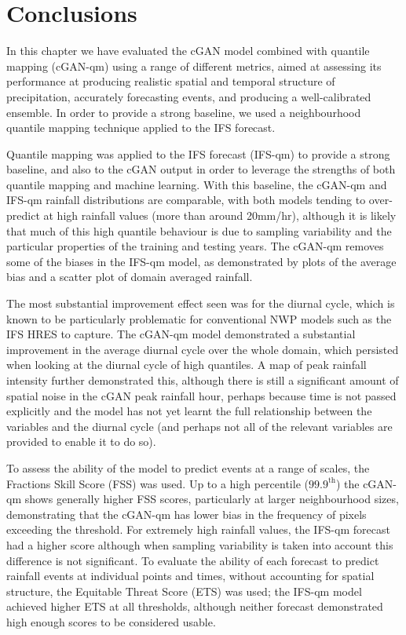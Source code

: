\documentclass[../main.tex]{subfiles}
\begin{document}

\section{Conclusions}

In this chapter we have evaluated the cGAN model combined with quantile mapping (cGAN-qm) using a range of different metrics, aimed at assessing its performance at producing realistic spatial and temporal structure of precipitation, accurately forecasting events, and producing a well-calibrated ensemble. In order to provide a strong baseline, we used a neighbourhood quantile mapping technique applied to the IFS forecast. 

Quantile mapping was applied to the IFS forecast (IFS-qm) to provide a strong baseline, and also to the cGAN output in order to leverage the strengths of both quantile mapping and machine learning. With this baseline, the cGAN-qm and IFS-qm rainfall distributions are comparable, with both models tending to over-predict at high rainfall values (more than around 20mm/hr), although it is likely that much of this high quantile behaviour is due to sampling variability and the particular properties of the training and testing years. The cGAN-qm removes some of the biases in the IFS-qm model, as demonstrated by plots of the average bias and a scatter plot of domain averaged rainfall.

The most substantial improvement effect seen was for the diurnal cycle, which is known to be particularly problematic for conventional NWP models such as the IFS HRES to capture. The cGAN-qm model demonstrated a substantial improvement in the average diurnal cycle over the whole domain, which persisted when looking at the diurnal cycle of high quantiles. A map of peak rainfall intensity further demonstrated this, although there is still a significant amount of spatial noise in the cGAN peak rainfall hour, perhaps because time is not passed explicitly and the model has not yet learnt the full relationship between the variables and the diurnal cycle (and perhaps not all of the relevant variables are provided to enable it to do so).

To assess the ability of the model to predict events at a range of scales, the Fractions Skill Score (FSS) was used. Up to a high percentile ($99.9^{\text{th}}$) the cGAN-qm shows generally higher FSS scores, particularly at larger neighbourhood sizes, demonstrating that the cGAN-qm has lower bias in the frequency of pixels exceeding the threshold. For extremely high rainfall values, the IFS-qm forecast had a higher score although when sampling variability is taken into account this difference is not significant. To evaluate the ability of each forecast to predict rainfall events at individual points and times, without accounting for spatial structure, the Equitable Threat Score (ETS) was used; the IFS-qm model achieved higher ETS at all thresholds, although neither forecast demonstrated high enough scores to be considered usable.
\end{document}
